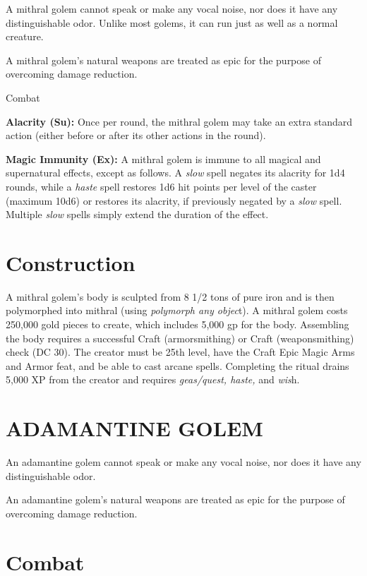 \documentclass{article}
\begin{document}
{A mithral golem cannot speak or make any vocal noise, nor does it have any distinguishable 
odor. Unlike most golems, it can run just as well as a normal creature. 

A mithral golem's natural weapons are treated as epic for the purpose of overcoming 
damage reduction.

Combat

\textbf{Alacrity (Su):} Once per round, the mithral golem may take an extra standard 
action (either before or after its other actions in the round). 

\textbf{Magic Immunity (Ex):} A mithral golem is immune to all magical and supernatural 
effects, except as follows. A \textit{slow }spell negates its alacrity for 1d4 
rounds, while a \textit{haste }spell restores 1d6 hit points per level of the caster 
(maximum 10d6) or restores its alacrity, if previously negated by a \textit{slow 
}spell. Multiple \textit{slow }spells simply extend the duration of the effect. 

\section*{Construction }

A mithral golem's body is sculpted from 8 1/2 tons of pure iron and is then polymorphed 
into mithral (using \textit{polymorph any objec}t). A mithral golem costs 250,000 
gold pieces to create, which includes 5,000 gp for the body. Assembling the body 
requires a successful Craft (armorsmithing) or Craft (weaponsmithing) check (DC 
30). The creator must be 25th level, have the Craft Epic Magic Arms and Armor feat, 
and be able to cast arcane spells. Completing the ritual drains 5,000 XP from the 
creator and requires \textit{geas/quest, haste, }and \textit{wis}h. 

\vspace{12pt}
\section*{ADAMANTINE GOLEM }

An adamantine golem cannot speak or make any vocal noise, nor does it have any 
distinguishable odor. 

An adamantine golem's natural weapons are treated as epic for the purpose of overcoming 
damage reduction.

\section*{Combat }

}
\end{document}
